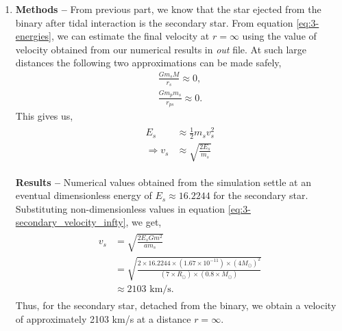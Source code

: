 \documentclass[a4paper]{article}
\begin{document}
\begin{enumerate} [label*=\textbf{(\alph*)}]
					The total energy of the binary, which is the sum of the energies of the two stars is conserved over time and is zero. After time \(t=0\), when the binary reaches the periastron, the energy of primary star becomes extremely negative, while the energy of the secondary star becomes extremely positive. This indicates that orbit of primary star become more bound to the black hole and vice versa. This suggests more strongly that deviations in orbits of stars of the binary are essentially due to gravitational interactions between binary and black hole, in case the point of approach is closer than some limiting value, decided by the value of \(D\). 
					
				\item
					\subitem \textbf{Methods --}
					From previous part, we know that the star ejected from the binary after tidal interaction is the secondary star. From equation \ref{eq:3-energies}, we can estimate the final velocity at \(r=\infty\) using the value of velocity obtained from our numerical results in \emph{out} file. At such large distances the following two approximations can be made safely,
					\begin{equation}
						\begin{gathered}
							\frac{G m_s M}{r_s} \approx 0, \\
							\frac{G m_p m_s}{r_{ps}} \approx 0 .
						\end{gathered}
					\end{equation}
					This gives us,
					\begin{equation}
						\begin{gathered}
							\begin{aligned}
								E_s &\approx \frac{1}{2} m_s v_s^2 \\
								\Rightarrow v_s &\approx \sqrt{\frac{2 E_s}{m_s}}
							\end{aligned}
						\end{gathered}
						\label{eq:3-secondary_velocity_infty}
					\end{equation}
				
					\subitem \textbf{Results --}
					Numerical values obtained from the simulation settle at an eventual dimensionless energy of \(E_s \approx 16.2244\) for the secondary star. Substituting non-dimensionless values in equation \ref{eq:3-secondary_velocity_infty}, we get,
					\begin{equation}
						\begin{gathered}
							\begin{aligned}
								v_s &= \sqrt{\frac{2 E_s G m^2}{a m_s}} \\
								&= \sqrt{\frac{2 \times 16.2244 \times (1.67\times 10^{-11}) \times (4M_\odot)^2_{}}{(7\times R_\odot)\times(0.8 \times M_\odot)}}\\
								&\approx 2103 \text{ km/s}.
							\end{aligned}
						\end{gathered}
					\end{equation}
					Thus, for the secondary star, detached from the binary, we obtain a velocity of approximately 2103 km/s at a distance \(r=\infty\). 
					

\end{enumerate}
\end{document}
